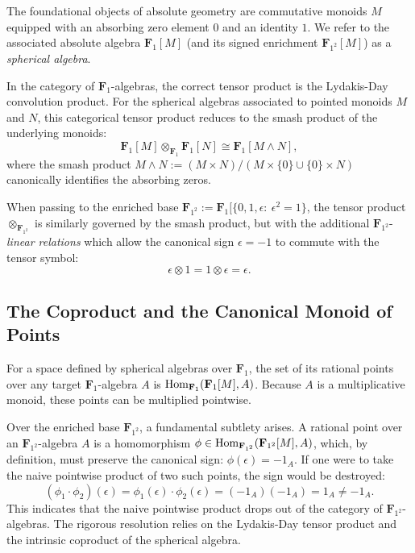\documentclass[11pt,a4paper]{article}
\newcommand{\Fone}{\mathbf{F}_{1}}
\newcommand{\Ftwo}{\mathbf{F}_{1^2}}
\newcommand{\Hom}{{\rm{Hom}}}
\begin{document}
The foundational objects of absolute geometry are commutative monoids $M$ equipped with an absorbing zero element $0$ and an identity $1$. We refer to the associated absolute algebra $\Fone[M]$ (and its signed enrichment $\Ftwo[M]$) as a \emph{spherical algebra}. 

In the category of $\Fone$-algebras, the correct tensor product is the Lydakis-Day convolution product. For the spherical algebras associated to pointed monoids $M$ and $N$, this categorical tensor product reduces  to the smash product of the underlying monoids:
\begin{equation*}
\Fone[M] \otimes_{\Fone} \Fone[N] \cong \Fone[M \wedge N],
\end{equation*}
where the smash product $M \wedge N := (M \times N) / (M \times \{0\} \cup \{0\} \times N)$ canonically identifies the absorbing zeros. 

When passing to the enriched base $\Ftwo:=\Fone[\{0,1,\epsilon:~\epsilon^2 = 1\}$, the tensor product $\otimes_{\Ftwo}$ is similarly governed by the smash product, but with the additional $\Ftwo$-\emph{linear relations} which allow the canonical sign $\epsilon = -1$ to commute with the tensor symbol:
\begin{equation*}
\epsilon \otimes 1 = 1 \otimes \epsilon = \epsilon.
\end{equation*}

\subsection{The Coproduct and the Canonical Monoid of Points}\label{sect2.2}

For a space defined by spherical algebras over $\Fone$, the set of its rational points over any target $\Fone$-algebra $A$ is  $\Hom_{\Fone}(\Fone[M], A)$. Because $A$ is a multiplicative monoid, these points can be multiplied pointwise.

Over the enriched base $\Ftwo$, a fundamental subtlety arises. A rational point over an $\Ftwo$-algebra $A$ is a homomorphism $\phi \in \Hom_{\Ftwo}(\Ftwo[M], A)$, which, by definition, must preserve the canonical sign: $\phi(\epsilon) = -1_A$. If one were to take the naive pointwise product of two such points, the sign would be destroyed:
\begin{equation*}
(\phi_1 \cdot \phi_2)(\epsilon) = \phi_1(\epsilon) \cdot \phi_2(\epsilon) = (-1_A)(-1_A) = 1_A \neq -1_A.
\end{equation*}
This indicates that the naive pointwise product drops out of the category of $\Ftwo$-algebras. The rigorous resolution relies on the Lydakis-Day tensor product and the intrinsic coproduct of the spherical algebra.
\end{document}
